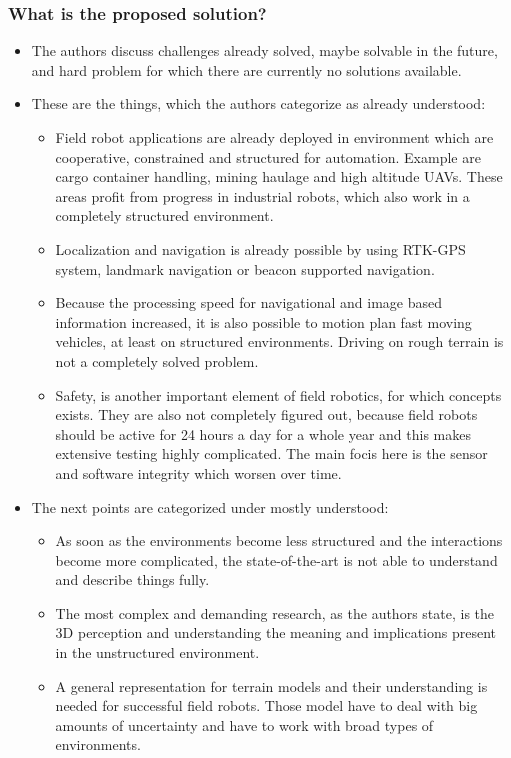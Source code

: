 \subsubsection*{What is the proposed solution?}
\begin{itemize}
    \item The authors discuss challenges already solved, maybe solvable in the future, and hard problem for which there are currently no solutions available. 
    \item These are the things, which the authors categorize as already understood: \ \begin{itemize}
        \item Field robot applications are already deployed in environment which are cooperative, constrained and structured for automation. Example are cargo container handling, mining haulage and high altitude UAVs. These areas profit from progress in industrial robots, which also work in a completely structured environment.
        \item Localization and navigation is already possible by using RTK-GPS system, landmark navigation or beacon supported navigation.
        \item Because the processing speed for navigational and image based information increased, it is also possible to motion plan fast moving vehicles, at least on structured environments. Driving on rough terrain is not a completely solved problem.
        \item Safety, is another important element of field robotics, for which concepts exists. They are also not completely figured out, because field robots should be active for 24 hours a day for a whole year and this makes extensive testing highly complicated. The main focis here is the sensor and software integrity which worsen over time.
    \end{itemize}
    \item The next points are categorized under mostly understood: \ \begin{itemize}
        \item As soon as the environments become less structured and the interactions become more complicated, the state-of-the-art is not able to understand and describe things fully.
        \item The most complex and demanding research, as the authors state, is the 3D perception and understanding the meaning and implications present in the unstructured environment.
        \item A general representation for terrain models and their understanding is needed for successful field robots. Those model have to deal with big amounts of uncertainty and have to work with broad types of environments.

\end{itemize}
\end{itemize}
